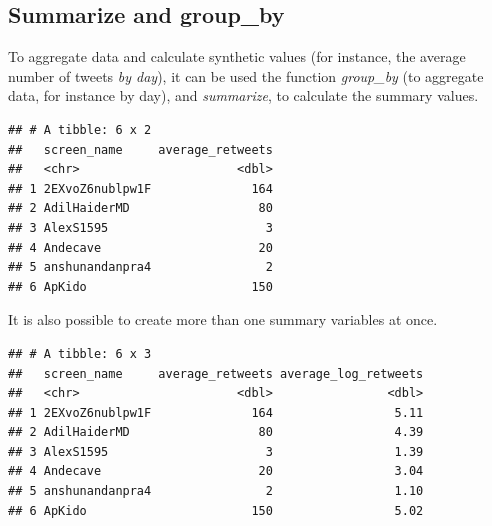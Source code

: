 \documentclass[
]{article}
\newenvironment{Shaded}{\begin{snugshade}}{\end{snugshade}}
\newcommand{\DataTypeTok}[1]{\textcolor[rgb]{0.13,0.29,0.53}{#1}}
\newcommand{\KeywordTok}[1]{\textcolor[rgb]{0.13,0.29,0.53}{\textbf{#1}}}
\newcommand{\NormalTok}[1]{#1}
\newcommand{\OperatorTok}[1]{\textcolor[rgb]{0.81,0.36,0.00}{\textbf{#1}}}
\newcommand{\StringTok}[1]{\textcolor[rgb]{0.31,0.60,0.02}{#1}}
\begin{document}
\hypertarget{summarize-and-group_by}{%
\subsection{Summarize and group\_by}\label{summarize-and-group_by}}

To aggregate data and calculate synthetic values (for instance, the average number of tweets \emph{by day}), it can be used the function \emph{group\_by} (to aggregate data, for instance by day), and \emph{summarize}, to calculate the summary values.

\begin{Shaded}
\end{Shaded}

\begin{verbatim}
## # A tibble: 6 x 2
##   screen_name     average_retweets
##   <chr>                      <dbl>
## 1 2EXvoZ6nublpw1F              164
## 2 AdilHaiderMD                  80
## 3 AlexS1595                      3
## 4 Andecave                      20
## 5 anshunandanpra4                2
## 6 ApKido                       150
\end{verbatim}

It is also possible to create more than one summary variables at once.

\begin{Shaded}
\end{Shaded}

\begin{verbatim}
## # A tibble: 6 x 3
##   screen_name     average_retweets average_log_retweets
##   <chr>                      <dbl>                <dbl>
## 1 2EXvoZ6nublpw1F              164                 5.11
## 2 AdilHaiderMD                  80                 4.39
## 3 AlexS1595                      3                 1.39
## 4 Andecave                      20                 3.04
## 5 anshunandanpra4                2                 1.10
## 6 ApKido                       150                 5.02
\end{verbatim}
\end{document}
